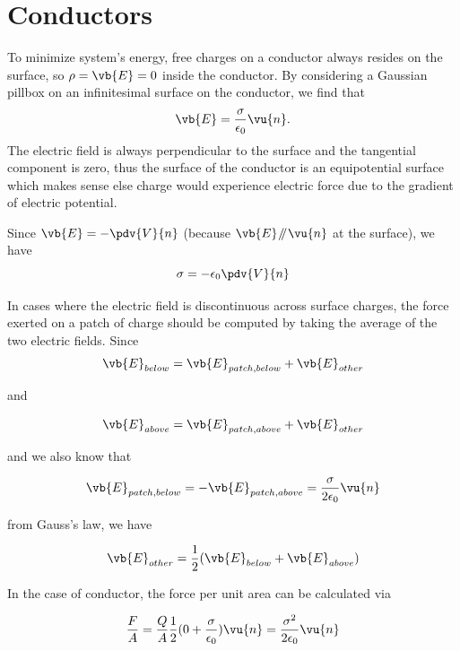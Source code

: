 \documentclass[a4paper,12pt]{report}
\begin{document}
	\section{Conductors}
	To minimize system's energy, free charges on a conductor always resides on the surface, so \(\rho  = \vb{E}  = 0 \) inside the conductor. By considering a Gaussian pillbox on an infinitesimal surface on the conductor, we find that 
	\begin{equation}
		\vb{E} = \frac{\sigma }{\epsilon_0} \vu{n}. 
	\end{equation}
	The electric field is always perpendicular to the surface and the tangential component is zero, thus the surface of the conductor is an equipotential surface which makes sense else charge would experience electric force due to the gradient of electric potential.
	
	Since \(\vb{E} = -\pdv{V}{n} \) (because \(\vb{E} \mathbin{\!/\mkern-5mu/\!} \vu{n} \) at the surface), we have 
	\begin{equation}
		\sigma  = -\epsilon_0 \pdv{V}{n} 
	\end{equation}
	
	In cases where the electric field is discontinuous across surface charges, the force exerted on a patch of charge should be computed by taking the average of the two electric fields. Since
	\begin{equation}
		\vb{E} _{below} = \vb{E} _{patch, below} + \vb{E} _{other}
	\end{equation}
	
	and 
	
	\begin{equation}
		\vb{E} _{above} = \vb{E} _{patch, above} + \vb{E} _{other} 
	\end{equation}
	
	and we also know that 
	
	\begin{equation}
		\vb{E} _{patch, below} = - \vb{E} _{patch, above} = \frac{\sigma }{2 \epsilon_0} \vu{n}  
	\end{equation}
	
	from Gauss's law, we have 
	
	\begin{equation}
		\vb{E} _{other} = \frac{1}{2} ( \vb{E} _{below} + \vb{E} _{above} )
	\end{equation}
	
	In the case of conductor, the force per unit area can be calculated via
	
	\begin{equation}
		\frac{F}{A} = \frac{Q}{A} \frac{1}{2} (0 + \frac{\sigma }{\epsilon_0}) \vu{n}  = \frac{\sigma ^2}{2 \epsilon_0} \vu{n}
	\end{equation}
	
\end{document}
